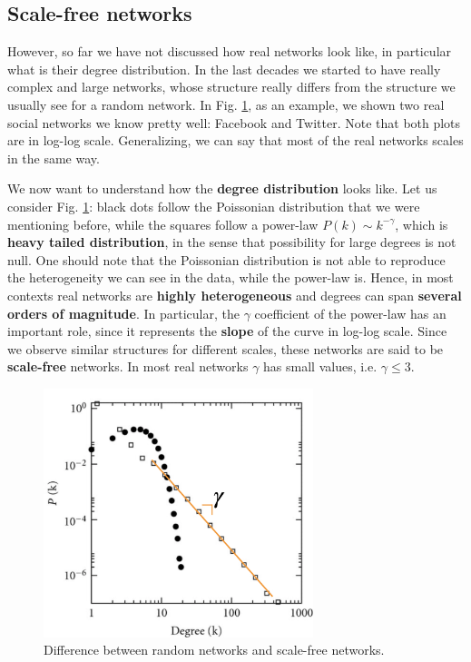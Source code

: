 \documentclass[../main/main.tex]{subfiles}
\begin{document}
\subsection{Scale-free networks}

However, so far we have not discussed how real networks look like, in particular what is their degree distribution. In the last decades we started to have really complex and large networks, whose structure really differs from the structure we usually see for a random network. In Fig. \ref{fig:06_4}, as an example, we shown two real social networks we know pretty well: Facebook and Twitter. Note that both plots are in log-log scale. Generalizing, we can say that most of the real networks scales in the same way.

We now want to understand how the \textbf{degree distribution} looks like. Let us consider Fig. \ref{fig:06_4}: black dots follow the Poissonian distribution that we were mentioning before, while the squares follow a power-law \( P(k) \sim k^{- \gamma  } \), which is \textbf{heavy tailed distribution}, in the sense that possibility for large degrees is not null. One should note that the Poissonian distribution is not able to reproduce the heterogeneity we can see in the data, while the power-law is. Hence, in most contexts real networks are \textbf{highly heterogeneous} and degrees can span \textbf{several orders of magnitude}. In particular, the \( \gamma   \) coefficient of the power-law has an important role, since it represents the \textbf{slope} of the curve in log-log scale.
Since we observe similar structures for different scales, these networks are said to be \textbf{scale-free} networks. In most real networks $\gamma$ has small values, i.e. \( \gamma \le 3 \).


\begin{figure}[h!]
\centering
\includegraphics[width=0.7\textwidth]{../lessons/image/06/5.png}
\caption{\label{fig:06_4} Difference between random networks and scale-free networks.}
\end{figure}
\end{document}
